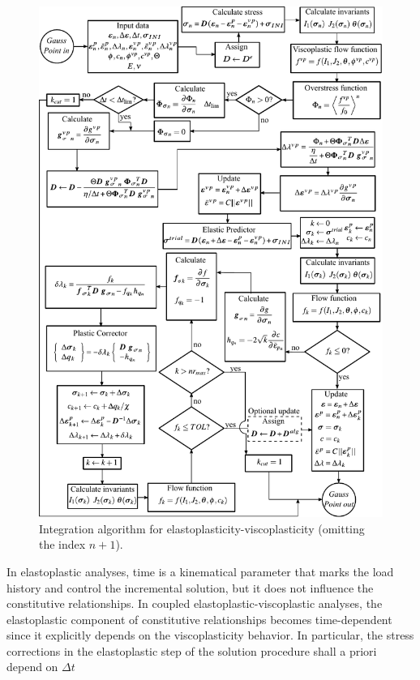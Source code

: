 \documentclass[Journal,letterpaper]{ascelike-new}
\begin{document}
\begin{figure}
	\centering
	\includegraphics[scale = 1.0]{FIG4.pdf}
	\caption{\label{integração EPVP}Integration algorithm for elastoplasticity-viscoplasticity (omitting the index $n+1$).}
\end{figure}

In elastoplastic analyses, time is a kinematical parameter that marks the load history and control the incremental solution, but it does not influence the constitutive relationships. In coupled elastoplastic-viscoplastic analyses, the elastoplastic component of constitutive relationships becomes time-dependent since it explicitly depends on the viscoplasticity behavior. In particular, the stress corrections in the elastoplastic step of the solution procedure shall a priori depend on $\Delta t$
\end{document}
